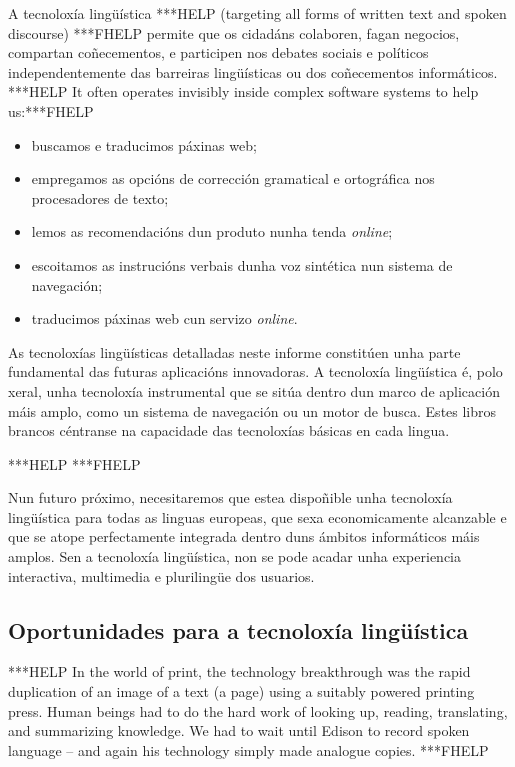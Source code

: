 \begin{multicols}{2}
A tecnoloxía lingüística ***HELP (targeting all forms of written text and spoken discourse) ***FHELP permite que os cidadáns colaboren, fagan negocios, compartan coñecementos, e participen nos debates sociais e políticos independentemente das barreiras lingüísticas ou dos coñecementos informáticos.  ***HELP It often operates invisibly inside complex software systems to help us:***FHELP
	\begin{itemize}
	   \item buscamos e traducimos páxinas web;  
	   \item empregamos as opcións de corrección gramatical e ortográfica nos procesadores de texto;
	   \item lemos as recomendacións dun produto nunha tenda \textit{online};
	   \item escoitamos as instrucións verbais dunha voz sintética nun sistema de navegación; 
	   \item traducimos páxinas web cun servizo \textit{online}.
	\end{itemize}
As tecnoloxías lingüísticas detalladas neste informe constitúen unha parte fundamental das futuras aplicacións innovadoras. A tecnoloxía lingüística é, polo xeral, unha tecnoloxía instrumental que se sitúa dentro dun marco de aplicación máis amplo, como un sistema de navegación ou un motor de busca. Estes libros brancos céntranse na capacidade das tecnoloxías básicas en cada lingua. 


***HELP  ***FHELP

Nun futuro próximo, necesitaremos que estea dispoñible unha tecnoloxía lingüística para todas as linguas europeas, que sexa economicamente alcanzable e que se atope perfectamente integrada dentro duns ámbitos informáticos máis amplos. Sen a tecnoloxía lingüística, non se pode acadar unha experiencia interactiva, multimedia e plurilingüe dos usuarios. 

\subsection{Oportunidades para a tecnoloxía lingüística}

 ***HELP
   In the world of print, the technology breakthrough was the rapid duplication of an image of a text (a page) using a suitably powered printing press. Human beings had to do the hard work of looking up, reading, translating, and summarizing knowledge. We had to wait until Edison to record spoken language – and again his technology simply made analogue copies. ***FHELP


\end{multicols}
